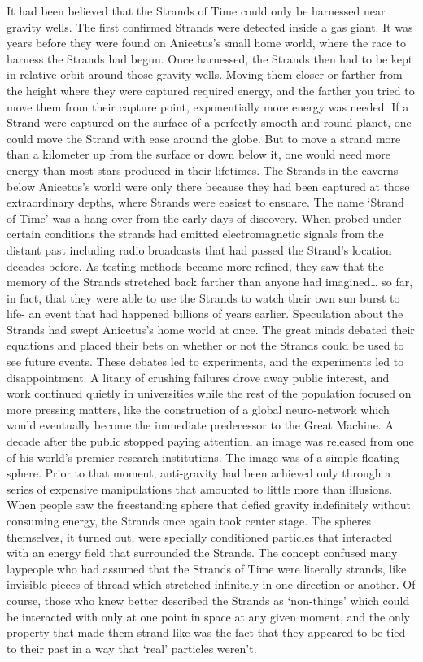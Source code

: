 \documentclass[a4paper]{article}
\begin{document}
It had been believed that the Strands of Time could only be harnessed near gravity wells. The first confirmed Strands were detected inside a gas giant. It was years before they were found on Anicetus’s small home world, where the race to harness the Strands had begun.
Once harnessed, the Strands then had to be kept in relative orbit around those gravity wells. Moving them closer or farther from the height where they were captured required energy, and the farther you tried to move them from their capture point, exponentially more energy was needed.
If a Strand were captured on the surface of a perfectly smooth and round planet, one could move the Strand with ease around the globe. But to move a strand more than a kilometer up from the surface or down below it, one would need more energy than most stars produced in their lifetimes. The Strands in the caverns below Anicetus’s world were only there because they had been captured at those extraordinary depths, where Strands were easiest to ensnare.
The name ‘Strand of Time’ was a hang over from the early days of discovery. When probed under certain conditions the strands had emitted electromagnetic signals from the distant past including radio broadcasts that had passed the Strand’s location decades before. As testing methods became more refined, they saw that the memory of the Strands stretched back farther than anyone had imagined… so far, in fact, that they were able to use the Strands to watch their own sun burst to life- an event that had happened billions of years earlier.
Speculation about the Strands had swept Anicetus’s home world at once. The great minds debated their equations and placed their bets on whether or not the Strands could be used to see future events. These debates led to experiments, and the experiments led to disappointment. A litany of crushing failures drove away public interest, and work continued quietly in universities while the rest of the population focused on more pressing matters, like the construction of a global neuro-network which would eventually become the immediate predecessor to the Great Machine.
A decade after the public stopped paying attention, an image was released from one of his world’s premier research institutions. The image was of a simple floating sphere. Prior to that moment, anti-gravity had been achieved only through a series of expensive manipulations that amounted to little more than illusions. When people saw the freestanding sphere that defied gravity indefinitely without consuming energy, the Strands once again took center stage.
The spheres themselves, it turned out, were specially conditioned particles that interacted with an energy field that surrounded the Strands. The concept confused many laypeople who had assumed that the Strands of Time were literally strands, like invisible pieces of thread which stretched infinitely in one direction or another. Of course, those who knew better described the Strands as ‘non-things’ which could be interacted with only at one point in space at any given moment, and the only property that made them strand-like was the fact that they appeared to be tied to their past in a way that ‘real’ particles weren’t.
\end{document}
